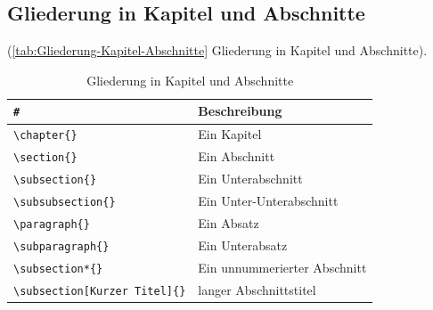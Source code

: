 \newpage %

\subsection{Gliederung in Kapitel und Abschnitte}\label{sec:Gliederung-Kapitel-Abschnitte}

(\autoref{tab:Gliederung-Kapitel-Abschnitte} Gliederung in Kapitel und Abschnitte).
\begin{table}[!hb]%
	\centering
	\begin{tabular} {ll}
		\toprule %
			\verb|#| & \textbf{Beschreibung} \\
	  \midrule
			\verb|\chapter{}      | & Ein Kapitel\\
			\verb|\section{}      | & Ein Abschnitt\\
			\verb|\subsection{}   | & Ein Unterabschnitt\\
			\verb|\subsubsection{}| & Ein Unter-Unterabschnitt\\
			\verb|\paragraph{}    | & Ein Absatz\\
			\verb|\subparagraph{} | & Ein Unterabsatz\\
			\verb|\subsection*{}  | & Ein unnummerierter Abschnitt\\
			\verb|\subsection[Kurzer Titel]{}| & langer Abschnittstitel\\
		\bottomrule
	\end{tabular}
		\caption{Gliederung in Kapitel und Abschnitte}	%
		\label{tab:Gliederung-Kapitel-Abschnitte}	      %
\end{table}

